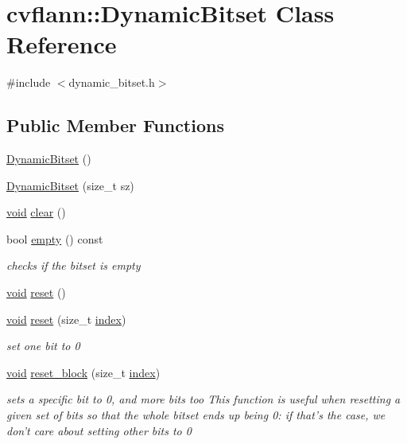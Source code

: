 \hypertarget{classcvflann_1_1DynamicBitset}{\section{cvflann\-:\-:Dynamic\-Bitset Class Reference}
\label{classcvflann_1_1DynamicBitset}
}


{\ttfamily \#include $<$dynamic\-\_\-bitset.\-h$>$}

\subsection*{Public Member Functions}
\begin{DoxyCompactItemize}
\item 
\hyperlink{classcvflann_1_1DynamicBitset_a36acd963e1d190288b9a0de61e953b62}{Dynamic\-Bitset} ()
\item 
\hyperlink{classcvflann_1_1DynamicBitset_ab9c6b803c9a4c5a3e44a800373de2611}{Dynamic\-Bitset} (size\-\_\-t sz)
\item 
\hyperlink{legacy_8hpp_a8bb47f092d473522721002c86c13b94e}{void} \hyperlink{classcvflann_1_1DynamicBitset_af95686fa6147337f50bbae026d994263}{clear} ()
\item 
bool \hyperlink{classcvflann_1_1DynamicBitset_a88ac25699a7a1442502eeef70634178f}{empty} () const 
\begin{DoxyCompactList}\small\item\em checks if the bitset is empty \end{DoxyCompactList}\item 
\hyperlink{legacy_8hpp_a8bb47f092d473522721002c86c13b94e}{void} \hyperlink{classcvflann_1_1DynamicBitset_acb0c1521b7eed9290aaaaf9d65782d9d}{reset} ()
\item 
\hyperlink{legacy_8hpp_a8bb47f092d473522721002c86c13b94e}{void} \hyperlink{classcvflann_1_1DynamicBitset_abf0edee568c0c58e5f736d094602dcdc}{reset} (size\-\_\-t \hyperlink{core__c_8h_a750b5d744c39a06bfb13e6eb010e35d0}{index})
\begin{DoxyCompactList}\small\item\em set one bit to 0 \end{DoxyCompactList}\item 
\hyperlink{legacy_8hpp_a8bb47f092d473522721002c86c13b94e}{void} \hyperlink{classcvflann_1_1DynamicBitset_a52a049ac5168c50d6063d6da7bf1a756}{reset\-\_\-block} (size\-\_\-t \hyperlink{core__c_8h_a750b5d744c39a06bfb13e6eb010e35d0}{index})
\begin{DoxyCompactList}\small\item\em sets a specific bit to 0, and more bits too This function is useful when resetting a given set of bits so that the whole bitset ends up being 0\-: if that's the case, we don't care about setting other bits to 0 \end{DoxyCompactList}\item 

\end{DoxyCompactItemize}
